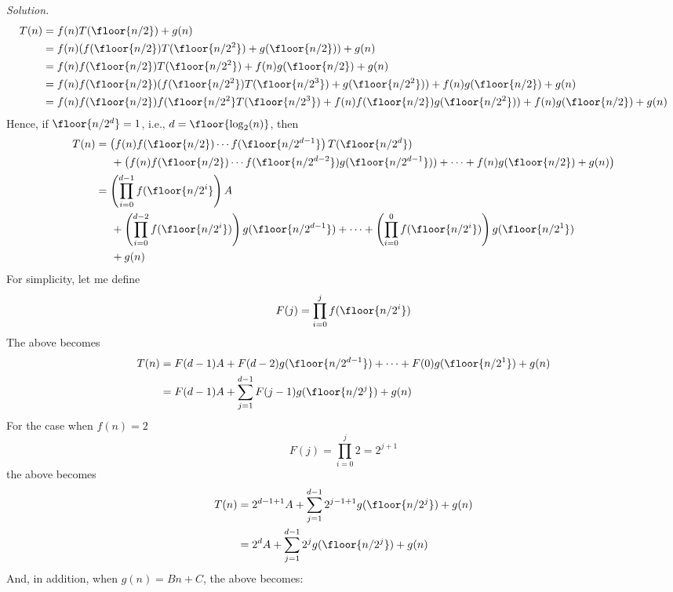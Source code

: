 \textit{Solution.}
\begin{align*}
T(n) 
&= f(n) T(\floor{n/2}) + g(n) \\
&= f(n) (f(\floor{n/2}) T(\floor{n/2^2}) + g(\floor{n/2})) + g(n) \\
&= f(n)f(\floor{n/2}) T(\floor{n/2^2}) + f(n)g(\floor{n/2}) + g(n) \\
&= f(n)f(\floor{n/2}) (f(\floor{n/2^2})T(\floor{n/2^3}) + g(\floor{n/2^2}))+ f(n)g(\floor{n/2}) + g(n) \\
&= f(n)f(\floor{n/2})f(\floor{n/2^2}T(\floor{n/2^3}) + f(n)f(\floor{n/2})g(\floor{n/2^2}))+ f(n)g(\floor{n/2}) + g(n) \\
\end{align*}
Hence, if $\floor{n/2^d} = 1$, i.e., $d = \floor{\log_2(n)}$, then
\begin{align*}
T(n) 
&=
   \left( 
       f(n)f(\floor{n/2})\cdots f(\floor{n/2^{d-1}} 
   \right)
   T(\floor{n/2^d}) \\
&\hspace{0.5cm} + 
   \left(
       f(n)f(\floor{n/2}) \cdots f(\floor{n/2^{d-2}}) g(\floor{n/2^{d-1}}))
         + \cdots 
         + f(n)g(\floor{n/2}) + g(n)
    \right)
\\
&= 
   \left( 
       \prod_{i=0}^{d-1} f(\floor{n/2^{i}} 
   \right)
   A \\
&\hspace{0.5cm} + 
   \left(
       \prod_{i=0}^{d-2} f(\floor{n/2^{i}})  
   \right)
   g(\floor{n/2^{d-1}})
   + \cdots + 
   \left(\prod_{i=0}^{0} f(\floor{n/2^i}) \right) g(\floor{n/2^1}) \\
&\hspace{0.5cm} + g(n)
\end{align*}
For simplicity, let me define
\[
F(j) = \prod_{i=0}^{j} f(\floor{n/2^{i}})
\]
The above becomes
\begin{align*}
T(n) 
&= F(d-1) A + 
   F(d-2) g(\floor{n/2^{d-1}})
   + \cdots + 
   F(0) g(\floor{n/2^1}) + g(n) \\
&= F(d-1) A +
   \sum_{j = 1}^{d-1} F(j-1)g(\floor{n/2^{j}})
   + g(n) 
\end{align*}
For the case when $f(n) = 2$
\[
F(j) = \prod_{i=0}^j 2 = 2^{j+1}
\]
the above becomes
\begin{align*}
T(n) 
&= 2^{d-1 + 1} A +
   \sum_{j = 1}^{d-1} 2^{j-1 + 1}g(\floor{n/2^{j}})
   + g(n) 
\\
&= 2^d A +
   \sum_{j=1}^{d-1} 2^{j}g(\floor{n/2^{j}})
   + g(n) 
\end{align*}
And, in addition, when $g(n) = Bn + C$, the above becomes:
